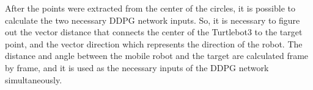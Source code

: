 After the points were extracted from the center of the circles, it is possible to calculate the two necessary DDPG network inputs.
So, it is necessary to figure out the vector distance that connects the center of the Turtlebot3 to the target point, and the vector direction which represents the direction of the robot.
The distance and angle between the mobile robot and the target are calculated frame by frame, and it is used as the necessary inputs of the DDPG network simultaneously.









